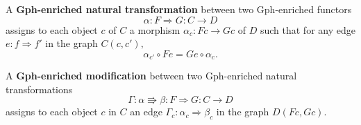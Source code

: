 \documentclass[submission,copyright,creativecommons]{eptcs}
\newcommand{\maps}{\colon}
\begin{document}
A {\bf Gph-enriched natural transformation} between two Gph-enriched functors 
\[\alpha\maps F \Rightarrow G\maps C \to D\]
assigns to each object $c$ of $C$ a morphism $\alpha_c\maps Fc \to Gc$ of $D$ such that for any edge $e\maps f \Rightarrow f'$ in the graph $C(c,c'),$
\[\alpha_{c'}\circ Fe = Ge \circ \alpha_c.\]

A {\bf Gph-enriched modification} between two Gph-enriched natural transformations
\[\Gamma\maps \alpha \Rrightarrow \beta\maps F\Rightarrow G\maps C\to D\]
assigns to each object $c$ in $C$ an edge $\Gamma_c\maps \alpha_c \Rightarrow \beta_c$ in the graph $D(Fc, Gc).$

\begin{thebibliography}{99}

\newcommand{\quantph}[1]{\href{http://arxiv.org/abs/quant-ph/#1}{{ arXiv:quant-ph/#1}}}
\newcommand{\hepth}[1]{\href{http://arxiv.org/abs/hep-th/#1}{{ arXiv:hep-th/#1}}}
\newcommand{\grqc}[1]{\href{http://arxiv.org/abs/gr-qc/#1}{{ arXiv:gr-qc/#1}}}
\newcommand{\qalg}[1]{\href{http://arxiv.org/abs/q-alg/#1}{{ arXiv:q-alg/#1}}}
\newcommand{\mathph}[1]{\href{http://arxiv.org/abs/math-ph/#1}{{ arXiv:math-ph/#1}}}
\newcommand{\Math}[1]{\href{http://arxiv.org/abs/math/#1}{{ arXiv:math/#1}}}
\newcommand{\arxiv}[1]{\href{http://arxiv.org/abs/#1}{{ arXiv:#1}}}


\end{thebibliography}
\end{document}
